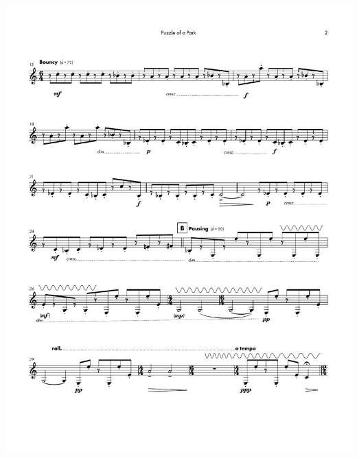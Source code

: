     \begin{center}
    \includegraphics[scale=0.75]{Scores/puzzlePart7.pdf}
    \end{center}
    \newpage
